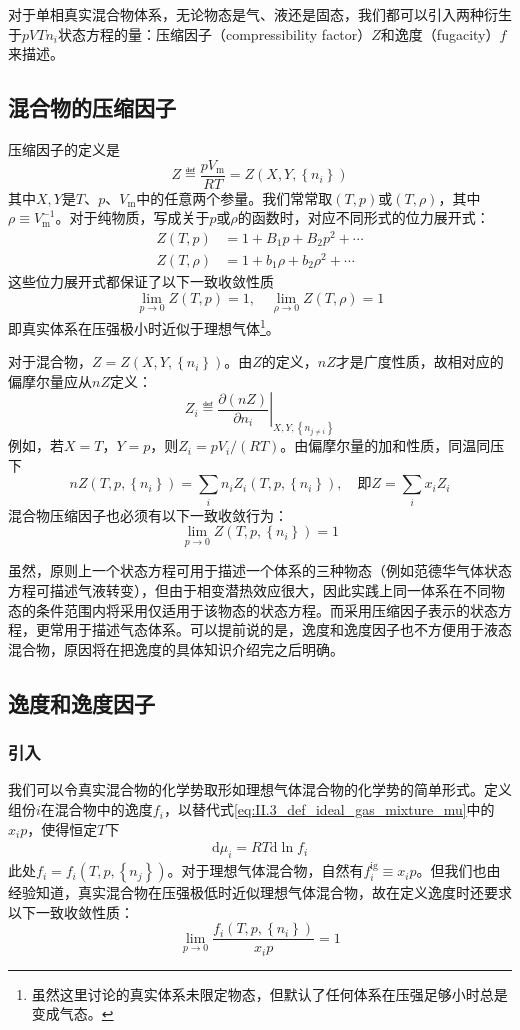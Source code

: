 \documentclass[main.tex]{subfiles}
\begin{document}
对于单相真实混合物体系，无论物态是气、液还是固态，我们都可以引入两种衍生于$pVTn_i$状态方程的量：压缩因子（compressibility factor）$Z$和逸度（fugacity）$f$来描述。

\subsection{混合物的压缩因子}
压缩因子的定义是
\[Z\eqdef \frac{pV_\text{m}}{RT}=Z\left(X,Y,\left\{n_i\right\}\right)\]
其中$X,Y$是$T$、$p$、$V_\text{m}$中的任意两个参量。我们常常取$\left(T,p\right)$或$\left(T,\rho\right)$，其中$\rho\equiv V^{-1}_\text{m}$。对于纯物质，写成关于$p$或$\rho$的函数时，对应不同形式的位力展开式：
\begin{align*}
    Z\left(T,p\right)    & =1+B_1p+B_2p^2+\cdots       \\
    Z\left(T,\rho\right) & =1+b_1\rho+b_2\rho^2+\cdots
\end{align*}
这些位力展开式都保证了以下一致收敛性质
\[\lim_{p\to 0}Z\left(T,p\right)=1,\quad\lim_{\rho\to 0}Z\left(T,\rho\right)=1\]
即真实体系在压强极小时近似于理想气体\footnote{虽然这里讨论的真实体系未限定物态，但默认了任何体系在压强足够小时总是变成气态。}。

对于混合物，$Z=Z\left(X,Y,\left\{n_i\right\}\right)$。由$Z$的定义，$nZ$才是广度性质，故相对应的偏摩尔量应从$nZ$定义：
\[Z_i\eqdef\left.\frac{\partial\left(nZ\right)}{\partial n_i}\right|_{X,Y,\left\{n_{j\neq i}\right\}}\]
例如，若$X=T$，$Y=p$，则$Z_i=pV_i/\left(RT\right)$。由偏摩尔量的加和性质，同温同压下
\[nZ\left(T,p,\left\{n_i\right\}\right)=\sum_in_iZ_i\left(T,p,\left\{n_i\right\}\right),\quad \text{即}Z=\sum_ix_iZ_i\]
混合物压缩因子也必须有以下一致收敛行为：
\[\lim_{p\to 0}Z\left(T,p,\left\{n_i\right\}\right)=1\]

虽然，原则上一个状态方程可用于描述一个体系的三种物态（例如范德华气体状态方程可描述气液转变），但由于相变潜热效应很大，因此实践上同一体系在不同物态的条件范围内将采用仅适用于该物态的状态方程。而采用压缩因子表示的状态方程，更常用于描述气态体系。可以提前说的是，逸度和逸度因子也不方便用于液态混合物，原因将在把逸度的具体知识介绍完之后明确。

\subsection{逸度和逸度因子}
\subsubsection{引入}
我们可以令真实混合物的化学势取形如理想气体混合物的化学势的简单形式。定义组份$i$在混合物中的逸度$f_i$，以替代式\eqref{eq:II.3_def_ideal_gas_mixture_mu}中的$x_ip$，使得恒定$T$下
\begin{align}\label{eq:II.4_def_fugacity_i}
    \mathrm{d}\mu_i=RT\mathrm{d}\ln f_i
\end{align}
此处$f_i=f_i\left(T,p,\left\{n_j\right\}\right)$。对于理想气体混合物，自然有$f_i^\text{ig}\equiv x_i p$。但我们也由经验知道，真实混合物在压强极低时近似理想气体混合物，故在定义逸度时还要求以下一致收敛性质：
\[\lim_{p\to 0}\frac{f_i\left(T,p,\left\{n_i\right\}\right)}{x_i p}=1\]
\end{document}
